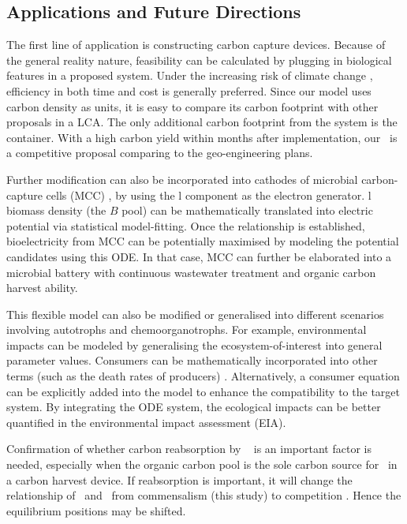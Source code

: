 \documentclass[../thesis.tex]{subfiles} %
\begin{document}
\subsection{Applications and Future Directions}
The first line of application is constructing carbon capture devices.  Because of the general reality nature, feasibility can be calculated by plugging in biological features in a proposed system.  Under the increasing risk of climate change \autocite{notz2016observed,schuur2015climate}, efficiency in both time and cost is generally preferred.  Since our model uses carbon density as units, it is easy to compare its carbon footprint with other proposals in a LCA.  The only additional carbon footprint from the system is the container.  With a high carbon yield within months after implementation, our \pbs\ is a competitive proposal comparing to the geo-engineering plans.

Further modification can also be incorporated into cathodes of microbial carbon-capture cells (MCC) \autocite{varanasi2020improvement,mohamed2020bioelectricity,neethu2018enhancement,pandit2012microbial}, by using the \bac l component as the electron generator.  \Bac l biomass density (the $B$ pool) can be mathematically translated into electric potential via statistical model-fitting.  Once the relationship is established, bioelectricity from MCC can be potentially maximised by modeling the potential candidates using this ODE.  In that case, MCC can further be elaborated into a microbial battery with continuous wastewater treatment \autocite{mohamed2020bioelectricity} and organic carbon harvest ability.

This flexible model can also be modified or generalised into different scenarios involving autotrophs and chemoorganotrophs.  For example, environmental impacts can be modeled by generalising the ecosystem-of-interest into general parameter values.  Consumers can be mathematically incorporated into other terms (such as the death rates of producers) \autocite{hurtt1996pelagic}.  Alternatively, a consumer equation can be explicitly added into the model to enhance the compatibility to the target system.  By integrating the ODE system, the ecological impacts can be better quantified in the environmental impact assessment (EIA).

Confirmation of whether carbon reabsorption by \phy\ \autocite{j1989respiration,bratbak1985phytoplankton,samejima1958heterotrophic} is an important factor is needed, especially when the organic carbon pool is the sole carbon source for \bac\ in a carbon harvest device.  If reabsorption is important, it will change the relationship of \phy\ and \bac\ from commensalism (this study) to competition \autocite{bratbak1985phytoplankton}.  Hence the equilibrium positions may be shifted.
\end{document}
